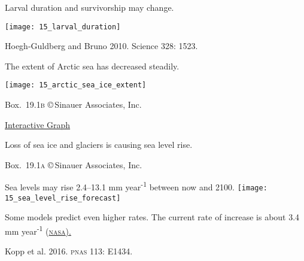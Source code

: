 \documentclass[t]{beamer}
\begin{document}
%
%
%
%
\begin{frame}[t]{Larval duration and survivorship may change.}

	\texttt{[image: 15\_larval\_duration]}
	
	\vfilll
	
	\hfill \tiny Hoegh-Guldberg and Bruno 2010. Science 328: 1523.
	
\end{frame}
%
\begin{frame}[t]{The extent of Arctic sea has decreased steadily.}

	{\centering \texttt{[image: 15\_arctic\_sea\_ice\_extent]}\par
	}

	\vfilll
	
	\hfill \tiny Box.~19.1\textsc{b} \copyright\,Sinauer Associates, Inc.

\end{frame}
%
{
\begin{frame}[b]

	\tiny \href{http://nsidc.org/arcticseaicenews/charctic-interactive-sea-ice-graph/}{Interactive Graph}

\end{frame}
}
%
{
\begin{frame}[b]{Loss of sea ice and glaciers is causing sea level rise.}

	\hfill \tiny Box.~19.1\textsc{a} \copyright\,Sinauer Associates, Inc.
\end{frame}
}
%
\begin{frame}[t]{Sea levels may rise 2.4–13.1 mm year\textsuperscript{-1} between now and 2100.}
	\texttt{[image: 15\_sea\_level\_rise\_forecast]}
	
	\hangpara Some models predict even higher rates. The current rate of increase is about 3.4 mm year\textsuperscript{-1} (\href{http://climate.nasa.gov/vital-signs/sea-level/}{\textsc{nasa}).}
	
	\vfilll
	
	\hfill \tiny Kopp et al. 2016. \textsc{pnas} 113: E1434.
\end{frame}
\end{document}
